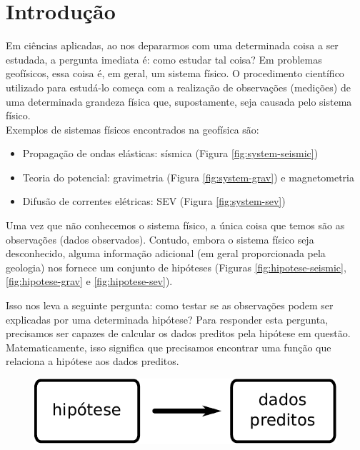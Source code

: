 \chapter{Introdução}
\label{chap:intro}

\indent Em ciências aplicadas, ao nos depararmos com uma determinada coisa a ser
estudada, a pergunta imediata é: como estudar tal coisa? Em problemas geofísicos,
essa coisa é, em geral, um sistema físico. O procedimento científico utilizado
para estudá-lo começa com a realização de observações (medições) de uma
determinada grandeza física que, supostamente, seja causada pelo sistema físico.
\\
\indent Exemplos de sistemas físicos encontrados na geofísica são:

\begin{itemize}
    \item{Propagação de ondas elásticas: sísmica (Figura \ref{fig:system-seismic})}
    \item{Teoria do potencial: gravimetria (Figura \ref{fig:system-grav}) e magnetometria}
    \item{Difusão de correntes elétricas: SEV (Figura \ref{fig:system-sev})}
\end{itemize}

\indent Uma vez que não conhecemos o sistema físico, a única coisa que temos são as
observações (dados observados). Contudo, embora o sistema físico seja
desconhecido, alguma informação adicional (em geral proporcionada pela geologia)
nos fornece um conjunto de hipóteses (Figuras \ref{fig:hipotese-seismic},
\ref{fig:hipotese-grav} e \ref{fig:hipotese-sev}).


\indent Isso nos leva a seguinte pergunta: como testar se as observações podem ser
explicadas por uma determinada hipótese? Para responder esta pergunta,
precisamos ser capazes de calcular os dados preditos pela hipótese em questão.
Matematicamente, isso significa que precisamos encontrar uma função que
relaciona a hipótese aos dados preditos.

\begin{figure}[!htb]
  \centering
    \includegraphics[scale=0.7]{figs/hipotese-preditos}
  \label{fig:hipotese-preditos}
\end{figure}


